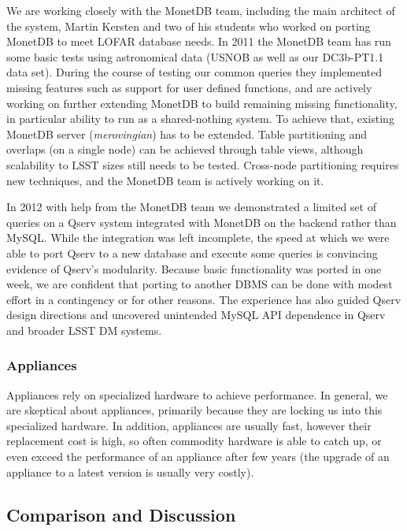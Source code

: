 \documentclass[DM,lsstdraft,toc]{lsstdoc}
\begin{document}
We are working closely with the MonetDB team, including the main
architect of the system, Martin Kersten and two of his students who
worked on porting MonetDB to meet LOFAR database needs. In 2011 the
MonetDB team has run some basic tests using astronomical data (USNOB as
well as our DC3b-PT1.1 data set). During the course of testing our
common queries they implemented missing features such as support for
user defined functions, and are actively working on further extending
MonetDB to build remaining missing functionality, in particular ability
to run as a shared-nothing system. To achieve that, existing MonetDB
server (\emph{merovingian}) has to be extended. Table partitioning and
overlaps (on a single node) can be achieved through table views,
although scalability to LSST sizes still needs to be tested. Cross-node
partitioning requires new techniques, and the MonetDB team is actively
working on it.

In 2012 with help from the MonetDB team we demonstrated a limited set of
queries on a Qserv system integrated with MonetDB on the backend rather
than MySQL. While the integration was left incomplete, the speed at
which we were able to port Qserv to a new database and execute some
queries is convincing evidence of Qserv's modularity. Because basic
functionality was ported in one week, we are confident that porting to
another DBMS can be done with modest effort in a contingency or for
other reasons. The experience has also guided Qserv design directions
and uncovered unintended MySQL API dependence in Qserv and broader LSST
DM systems.

\subsubsection{Appliances}\label{appliances}

Appliances rely on specialized hardware to achieve performance. In
general, we are skeptical about appliances, primarily because they are
locking us into this specialized hardware. In addition, appliances are
usually fast, however their replacement cost is high, so often commodity
hardware is able to catch up, or even exceed the performance of an
appliance after few years (the upgrade of an appliance to a latest
version is usually very costly).

\subsection{Comparison and Discussion}\label{comparison-and-discussion}
\end{document}
